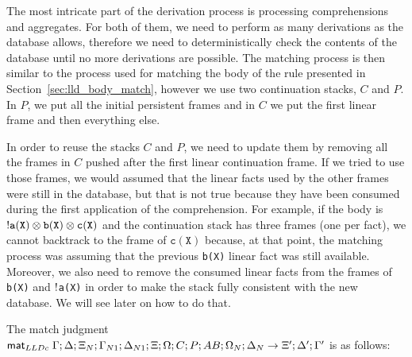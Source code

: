 The most intricate part of the derivation process is processing comprehensions
and aggregates. For both of them, we need to perform as many derivations as the
database allows, therefore we need to deterministically check the contents of
the database until no more derivations are possible.
The matching process is then similar to the process used for
matching the body of the rule presented in Section~\ref{sec:lld_body_match},
however we use two continuation stacks, $C$ and $P$. In $P$, we put all
the initial persistent frames and in $C$ we put the first linear frame
and then everything else.

In order to reuse the stacks $C$ and $P$, we need to update them by removing all
the frames in $C$ pushed after the first linear continuation frame.  If we tried
to use those frames, we would assumed that the linear facts used by the other
frames were still in the database, but that is not true because they have been
consumed during the first application of the comprehension.  For example, if the
body is ${!} \mathtt{a(X)} \otimes \mathtt{b(X)} \otimes \mathtt{c(X)}$ and
the continuation stack has three frames (one per fact), we cannot backtrack to
the frame of $\mathtt{c(X)}$ because, at that point, the matching process was
assuming that the previous \texttt{b(X)} linear fact was still available.
Moreover, we also need to remove the consumed linear facts from the frames of
\texttt{b(X)} and ${!}$\texttt{a(X)} in order to make the stack fully
consistent with the new database. We will see later on how to do that.

The match judgment $\mathsf{mat}_{LLDc} \; \Gamma; \Delta; \Xi_N; \Gamma_{N1};
\Delta_{N1}; \Xi; \Omega; C; P; AB; \Omega_N; \Delta_N \rightarrow \Xi';
\Delta'; \Gamma'$ is as follows:

